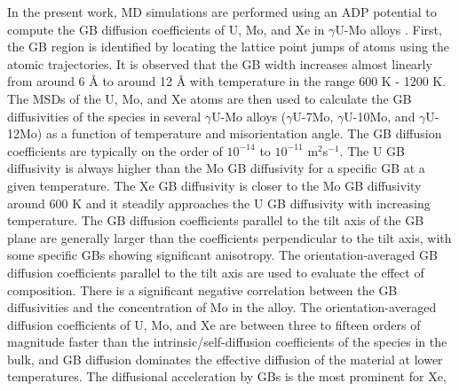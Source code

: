 \documentclass{elsarticle}
\providecommand{\DIFadd}[1]{{\protect\color{blue} \sf #1}} %
\providecommand{\DIFdel}[1]{}
\providecommand{\DIFaddbegin}{} %
\providecommand{\DIFaddend}{} %
\providecommand{\DIFdelbegin}{} %
\providecommand{\DIFdelend}{} %
\begin{document}
In the present work, MD simulations are performed using an ADP potential to compute \DIFaddbegin \DIFadd{the }\DIFaddend GB diffusion coefficients \DIFaddbegin \DIFadd{of U, Mo, and Xe }\DIFaddend in $\gamma$U-Mo alloys \cite{starikov2018}. First, \DIFdelbegin \DIFdel{a way to distinguish the GB atoms is developed by individually identifying atoms that are participating in the GB diffusion process}\DIFdelend \DIFaddbegin \DIFadd{the GB region is identified by locating the lattice point jumps of atoms using the atomic trajectories}\DIFaddend . It is observed that the \DIFdelbegin \DIFdel{number of GB atoms increases almost exponentially }\DIFdelend \DIFaddbegin \DIFadd{GB width increases almost linearly from around 6 \r{A} to around 12 \r{A} }\DIFaddend with temperature in the range \DIFdelbegin \DIFdel{of }\DIFdelend 600 K - 1200 K. The \DIFdelbegin \DIFdel{MSD of the GB atoms is }\DIFdelend \DIFaddbegin \DIFadd{MSDs of the U, Mo, and Xe atoms are }\DIFaddend then used to calculate the GB diffusivities of \DIFaddbegin \DIFadd{the species in }\DIFaddend several $\gamma$U-Mo alloys ($\gamma$U-7Mo, $\gamma$U-10Mo, and $\gamma$U-12Mo) as a function of temperature and misorientation angle. \DIFdelbegin \DIFdel{GB diffusivities of U, Mo, and Xe are computed along with total GB diffusivity. The total GB diffusion is }\DIFdelend \DIFaddbegin \DIFadd{The GB diffusion coefficients are }\DIFaddend typically on the order of \DIFdelbegin \DIFdel{$10^{-12}$ }\DIFdelend \DIFaddbegin \DIFadd{$10^{-14}$ }\DIFaddend to $10^{-11}$ m$^2$s$^{-1}$. The \DIFdelbegin \DIFdel{diffusivity is relatively insensitive to the misorientation angle, whereas there is a statistically }\DIFdelend \DIFaddbegin \DIFadd{U GB diffusivity is always higher than the Mo GB diffusivity for a specific GB at a given temperature. The Xe GB diffusivity is closer to the Mo GB diffusivity around 600 K and it steadily approaches the U GB diffusivity with increasing temperature. The GB diffusion coefficients parallel to the tilt axis of the GB plane are generally larger than the coefficients perpendicular to the tilt axis, with some specific GBs showing significant anisotropy. The orientation-averaged GB diffusion coefficients parallel to the tilt axis are used to evaluate the effect of composition. There is a }\DIFaddend significant negative correlation between the \DIFdelbegin \DIFdel{diffusivity }\DIFdelend \DIFaddbegin \DIFadd{GB diffusivities }\DIFaddend and the concentration of Mo \DIFdelbegin \DIFdel{. Furthermore, the GB diffusion of U is generally faster than that of Mo, which is faster than that of Xe. The GB diffusion }\DIFdelend \DIFaddbegin \DIFadd{in the alloy. The orientation-averaged diffusion coefficients }\DIFaddend of U, Mo, and Xe are between three to fifteen orders of magnitude faster than the intrinsic/self-diffusion coefficients \DIFdelbegin \DIFdel{from literature, where GB diffusion becomes more dominant }\DIFdelend \DIFaddbegin \DIFadd{of the species in the bulk, and GB diffusion dominates the effective diffusion of the material }\DIFaddend at lower temperatures. The \DIFdelbegin \DIFdel{GB diffusional acceleration is }\DIFdelend \DIFaddbegin \DIFadd{diffusional acceleration by GBs is the }\DIFaddend most prominent for Xe, \DIFdelbegin \DIFdel{which may dramatically impact }\DIFdelend \DIFaddbegin 
\end{document}
